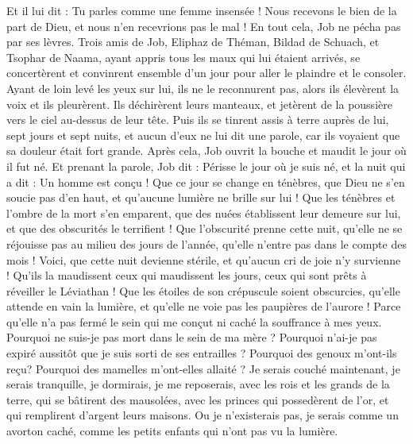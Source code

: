 \begin{multicols}{2}
Et il lui dit : Tu parles comme une femme insensée ! Nous recevons le bien de la part de Dieu, et nous n'en recevrions pas le mal ! En tout cela, Job ne pécha pas par ses lèvres.
Trois amis de Job, Eliphaz de Théman, Bildad de Schuach, et Tsophar de Naama, ayant appris tous les maux qui lui étaient arrivés, se concertèrent et convinrent ensemble d'un jour pour aller le plaindre et le consoler.
Ayant de loin levé les yeux sur lui, ils ne le reconnurent pas, alors ils élevèrent la voix et ils pleurèrent. Ils déchirèrent leurs manteaux, et jetèrent de la poussière vers le ciel au-dessus de leur tête.
Puis ils se tinrent assis à terre auprès de lui, sept jours et sept nuits, et aucun d'eux ne lui dit une parole, car ils voyaient que sa douleur était fort grande.
\VerseOne{}Après cela, Job ouvrit la bouche et maudit le jour où il fut né.
Et prenant la parole, Job dit :
Périsse le jour où je suis né, et la nuit qui a dit : Un homme est conçu !
Que ce jour se change en ténèbres, que Dieu ne s'en soucie pas d'en haut, et qu'aucune lumière ne brille sur lui !
Que les ténèbres et l'ombre de la mort s'en emparent, que des nuées établissent leur demeure sur lui, et que des obscurités le terrifient !
Que l'obscurité prenne cette nuit, qu'elle ne se réjouisse pas au milieu des jours de l'année, qu'elle n'entre pas dans le compte des mois !
Voici, que cette nuit devienne stérile, et qu'aucun cri de joie n'y survienne !
Qu'ils la maudissent ceux qui maudissent les jours, ceux qui sont prêts à réveiller le Léviathan !
Que les étoiles de son crépuscule soient obscurcies, qu'elle attende en vain la lumière, et qu'elle ne voie pas les paupières de l'aurore !
Parce qu'elle n'a pas fermé le sein qui me conçut ni caché la souffrance à mes yeux.
Pourquoi ne suis-je pas mort dans le sein de ma mère ? Pourquoi n'ai-je pas expiré aussitôt que je suis sorti de ses entrailles ?
Pourquoi des genoux m'ont-ils reçu? Pourquoi des mamelles m'ont-elles allaité ?
Je serais couché maintenant, je serais tranquille, je dormirais, je me reposerais,
avec les rois et les grands de la terre, qui se bâtirent des mausolées,
avec les princes qui possedèrent de l'or, et qui remplirent d'argent leurs maisons.
Ou je n'existerais pas, je serais comme un avorton caché, comme les petits enfants qui n'ont pas vu la lumière.

\end{multicols}

